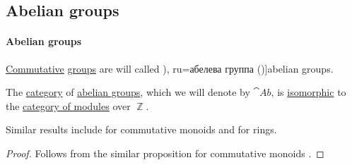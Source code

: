 \subsection{Abelian groups}\label{subsec:abelian_groups}

\paragraph{Abelian groups}

\begin{definition}\label{def:abelian_group}
  \hyperref[def:binary_operation/commutative]{Commutative} \hyperref[def:group]{groups} are will called \term[bg=абелева группа (\cite[75]{ГеновМиховскиМоллов1991}), ru=абелева группа (\cite[def. 1.1.1]{Винберг2014})]{abelian groups}.
\end{definition}

\begin{proposition}\label{thm:category_of_abelian_groups}
  The \hyperref[def:category]{category} of \hyperref[def:abelian_group]{abelian groups}, which we will denote by \( \cat{Ab} \), is \hyperref[rem:category_similarity/isomorphism]{isomorphic} to the \hyperref[def:module/category]{category of modules} over \( \BbbZ \).
\end{proposition}
\begin{comments}
  \item Similar results include  for commutative monoids and  for rings.
\end{comments}
\begin{proof}
  Follows from the similar proposition for commutative monoids .
\end{proof}

